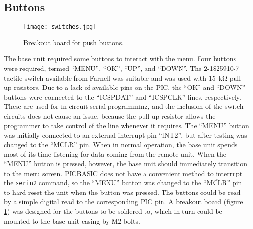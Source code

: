 \subsection{Buttons}
\begin{figure}[htb]
	\centering
	\texttt{[image: switches.jpg]}
	\caption{Breakout board for push buttons.}
	\label{fig: buttons}
\end{figure}

The base unit required some buttons to interact with the menu. Four buttons were required, termed ``MENU'', ``OK'', ``UP'', and ``DOWN''. The 2-1825910-7 tactile switch \cite{buttons} available from Farnell was suitable and was used with \SI{15}{\kilo\ohm} pull-up resistors. Due to a lack of available pins on the PIC, the ``OK'' and ``DOWN'' buttons were connected to the ``ICSPDAT'' and ``ICSPCLK'' lines, respectively. These are used for in-circuit serial programming, and the inclusion of the switch circuits does not cause an issue, because the pull-up resistor allows the programmer to take control of the line whenever it requires. The ``MENU'' button was initially connected to an external interrupt pin ``INT2'', but after testing was changed to the ``$\overline{\text{MCLR}}$'' pin. When in normal operation, the base unit spends most of its time listening for data coming from the remote unit. When the ``MENU'' button is pressed, however, the base unit should immediately transition to the menu screen. PICBASIC does not have a convenient method to interrupt the \verb|serin2| command, so the ``MENU'' button was changed to the ``$\overline{\text{MCLR}}$'' pin to hard reset the unit when the button was pressed. The buttons could be read by a simple digital read to the corresponding PIC pin. A breakout board (figure \ref{fig: buttons}) was designed for the buttons to be soldered to, which in turn could be mounted to the base unit casing by M2 bolts.








